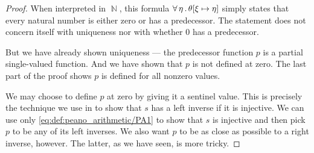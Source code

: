 \begin{proof}
  When interpreted in \( \BbbN \), this formula \( \forall \thinspace \eta \thinspace . \thinspace \theta[\xi \mapsto \eta] \) simply states that every natural number is either zero or has a predecessor. The statement does not concern itself with uniqueness nor with whether \( 0 \) has a predecessor.

  But we have already shown uniqueness --- the predecessor function \( p \) is a partial single-valued function. And we have shown that \( p \) is not defined at zero. The last part of the proof shows \( p \) is defined for all nonzero values.

  We may choose to define \( p \) at zero by giving it a sentinel value. This is precisely the technique we use in  to show that \( s \) has a left inverse if it is injective. We can use only \eqref{eq:def:peano_arithmetic/PA1} to show that \( s \) is injective and then pick \( p \) to be any of its left inverses. We also want \( p \) to be as close as possible to a right inverse, however. The latter, as we have seen, is more tricky.
\end{proof}

